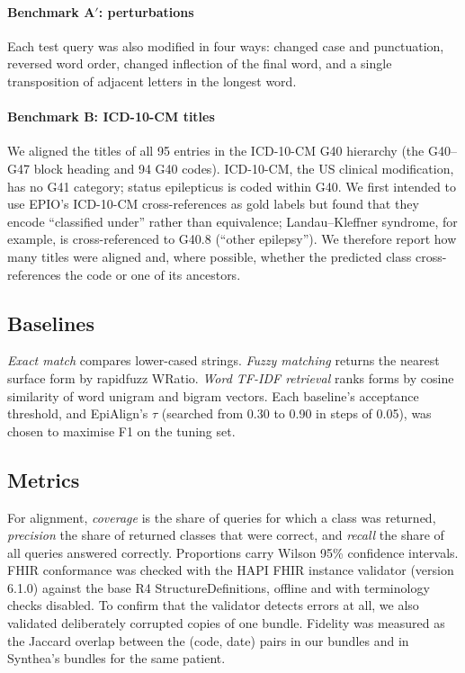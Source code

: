\documentclass[preprint,12pt]{elsarticle}
\begin{document}
\paragraph{Benchmark A$'$: perturbations} Each test query was also modified in four ways: changed case and punctuation, reversed word order, changed inflection of the final word, and a single transposition of adjacent letters in the longest word.

\paragraph{Benchmark B: ICD-10-CM titles} We aligned the titles of all 95 entries in the ICD-10-CM G40 hierarchy (the G40--G47 block heading and 94 G40 codes). ICD-10-CM, the US clinical modification, has no G41 category; status epilepticus is coded within G40. We first intended to use EPIO's ICD-10-CM cross-references as gold labels but found that they encode ``classified under'' rather than equivalence; Landau--Kleffner syndrome, for example, is cross-referenced to G40.8 (``other epilepsy''). We therefore report how many titles were aligned and, where possible, whether the predicted class cross-references the code or one of its ancestors.

\subsection{Baselines}
\textit{Exact match} compares lower-cased strings. \textit{Fuzzy matching} returns the nearest surface form by rapidfuzz WRatio. \textit{Word TF-IDF retrieval} ranks forms by cosine similarity of word unigram and bigram vectors. Each baseline's acceptance threshold, and EpiAlign's $\tau$ (searched from 0.30 to 0.90 in steps of 0.05), was chosen to maximise F1 on the tuning set.

\subsection{Metrics}
For alignment, \textit{coverage} is the share of queries for which a class was returned, \textit{precision} the share of returned classes that were correct, and \textit{recall} the share of all queries answered correctly. Proportions carry Wilson 95\% confidence intervals. FHIR conformance was checked with the HAPI FHIR instance validator \cite{hapi} (version 6.1.0) against the base R4 StructureDefinitions, offline and with terminology checks disabled. To confirm that the validator detects errors at all, we also validated deliberately corrupted copies of one bundle. Fidelity was measured as the Jaccard overlap between the (code, date) pairs in our bundles and in Synthea's bundles for the same patient.
\end{document}
